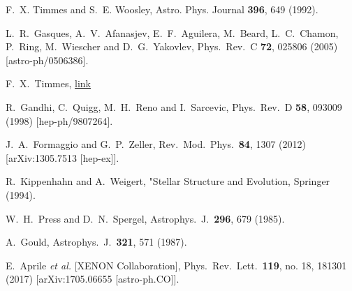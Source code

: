  F.~X. Timmes and S.~E. Woosley, 
 Astro. Phys. Journal {\bf 396}, 649 (1992).

  L.~R.~Gasques, A.~V.~Afanasjev, E.~F.~Aguilera, M.~Beard, L.~C.~Chamon, P.~Ring, M.~Wiescher and D.~G.~Yakovlev,
  Phys.\ Rev.\ C {\bf 72}, 025806 (2005)
  [astro-ph/0506386].


F.~X.~Timmes, \href{http://cococubed.asu.edu/code_pages/coldwd.shtml}{link}

  R.~Gandhi, C.~Quigg, M.~H.~Reno and I.~Sarcevic,
  Phys.\ Rev.\ D {\bf 58}, 093009 (1998)
  [hep-ph/9807264].


  J.~A.~Formaggio and G.~P.~Zeller,
  Rev.\ Mod.\ Phys.\  {\bf 84}, 1307 (2012)
  [arXiv:1305.7513 [hep-ex]].


R.~Kippenhahn and A.~Weigert, "Stellar Structure and Evolution, Springer (1994).

  W.~H.~Press and D.~N.~Spergel,
  Astrophys.\ J.\  {\bf 296}, 679 (1985).


  A.~Gould,
  Astrophys.\ J.\  {\bf 321}, 571 (1987).


  E.~Aprile {\it et al.} [XENON Collaboration],
  Phys.\ Rev.\ Lett.\  {\bf 119}, no. 18, 181301 (2017)
  [arXiv:1705.06655 [astro-ph.CO]].

